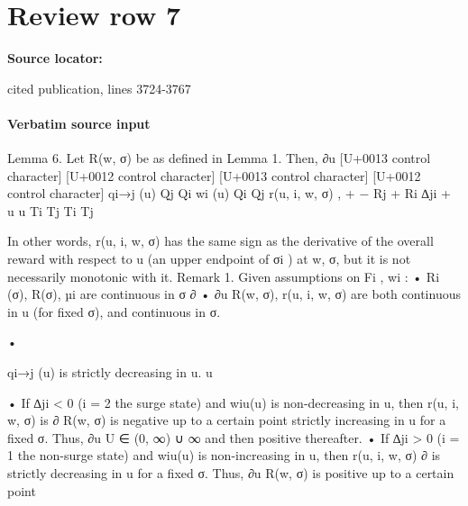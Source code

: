 \documentclass[10pt]{article}
\begin{document}
\section*{Review row 7}
\textbf{Source locator:} {\footnotesize\raggedright cited publication, lines 3724-\allowbreak{}3767\par}
\paragraph{Verbatim source input}
\begin{ReviewVerbatim}
Lemma 6. Let R(w, σ) be as defined in Lemma 1. Then, ∂u
[U+0013 control character]
[U+0012 control character]
[U+0013 control character] [U+0012 control character]
qi→j (u)
Qj
Qi
wi (u) Qi Qj
r(u, i, w, σ) ,
+
−
Rj +
Ri
∆ji +
u
u
Ti
Tj
Ti
Tj

In other words, r(u, i, w, σ) has the same sign as the derivative of the overall reward with respect
to u (an upper endpoint of σi ) at w, σ, but it is not necessarily monotonic with it.
Remark 1. Given assumptions on Fi , wi :
• Ri (σ), R(σ), µi are continuous in σ
∂
• ∂u
R(w, σ), r(u, i, w, σ) are both continuous in u (for fixed σ), and continuous in σ.

•

qi→j (u)
is strictly decreasing in u.
u

• If ∆ji < 0 (i = 2 the surge state) and wiu(u) is non-decreasing in u, then r(u, i, w, σ) is
∂
R(w, σ) is negative up to a certain point
strictly increasing in u for a fixed σ. Thus, ∂u
U ∈ (0, ∞) ∪ {∞} and then positive thereafter.
• If ∆ji > 0 (i = 1 the non-surge state) and wiu(u) is non-increasing in u, then r(u, i, w, σ)
∂
is strictly decreasing in u for a fixed σ. Thus, ∂u
R(w, σ) is positive up to a certain point
\end{ReviewVerbatim}
\end{document}
